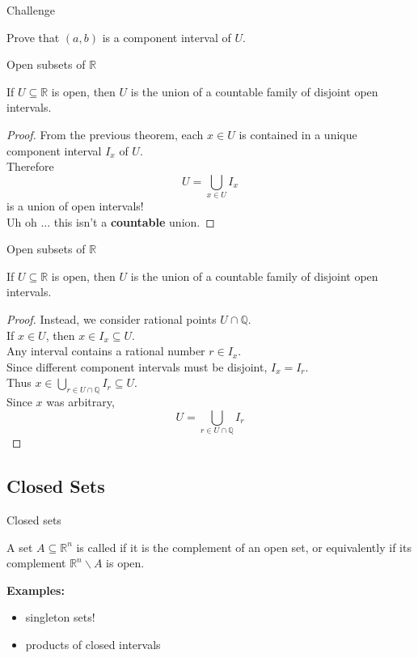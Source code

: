 \documentclass{beamer}
\begin{document}
\begin{frame}{Challenge}
\begin{prob}
Prove that $(a,b)$ is a component interval of $U$.
\end{prob}
\end{frame}

\begin{frame}{Open subsets of $\mathbb{R}$}
\begin{thm}
If $U\subseteq\mathbb{R}$ is open, then $U$ is the union of a countable family of disjoint open intervals.
\end{thm}
\pause
\begin{proof}
From the previous theorem, each $x\in U$ is contained in a unique component interval $I_x$ of $U$.\\
\pause
Therefore
$$U = \bigcup_{x\in U} I_x$$
is a union of open intervals!\\
\pause
{\color{red}Uh oh ... this isn't a \textbf{countable} union.}
\end{proof}
\end{frame}

\begin{frame}{Open subsets of $\mathbb{R}$}
\begin{thm}
If $U\subseteq\mathbb{R}$ is open, then $U$ is the union of a countable family of disjoint open intervals.
\end{thm}
\begin{proof}
Instead, we consider rational points $U\cap\mathbb{Q}$.\\
\pause
If $x\in U$, then $x\in I_x\subseteq U$.\\
\pause
Any interval contains a rational number $r\in I_x$.\\
\pause
Since different component intervals must be disjoint, $I_x=I_r$.\\
\pause
Thus $x\in \bigcup_{r\in U\cap\mathbb{Q}} I_r\subseteq U$.\\
\pause
Since $x$ was arbitrary, 
$$U= \bigcup_{r\in U\cap\mathbb{Q}} I_r$$
\end{proof}
\end{frame}



\subsection{Closed Sets}

\begin{frame}{Closed sets}
\begin{defn}
A set $A\subseteq\mathbb{R}^n$ is called  if it is the complement of an open set, or equivalently if its complement $\mathbb{R}^n\backslash A$ is open.
\end{defn}
\pause
\textbf{Examples:}
\begin{itemize}
\pause
\item singleton sets!
\pause
\item products of closed intervals
\end{itemize}
\end{frame}
\end{document}
